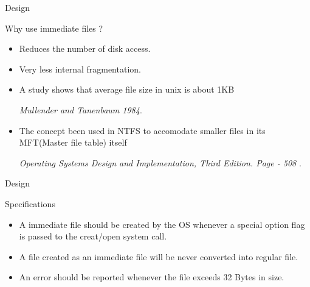 \documentclass{beamer}
\begin{document}
\begin{frame}{Design}
\begin{Huge}
Why use immediate files ? \linebreak
\end{Huge}
\begin{itemize}
\item Reduces the number of disk access.
\item Very less internal fragmentation.
\item A study shows that average file size in unix is about 1KB  \begin{tiny}
 { \em Mullender and Tanenbaum 1984}.
\end{tiny}
\item The concept been used in NTFS to accomodate smaller files in its MFT(Master file table) itself \begin{tiny}
 { \em Operating Systems Design and Implementation, Third Edition. Page - 508 }.
\end{tiny}
\end{itemize}


\end{frame}



\begin{frame}{Design}
\begin{Huge}
Specifications
\linebreak
\end{Huge}

\begin{itemize}
\item A immediate file should be created by the OS whenever a special option flag is passed to the creat/open system call.
\item A file created as an immediate file will be never converted into regular file.
\item An error should be reported whenever the file exceeds 32 Bytes in size. 
\end{itemize}
\end{frame}
\end{document}
